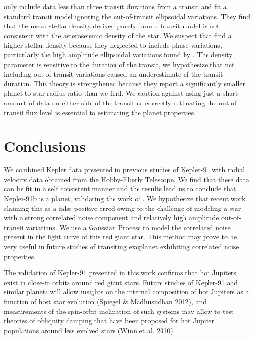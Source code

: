 \documentclass[apjl]{emulateapj}
\begin{document}
\citet{sliski14} only include data less than three transit durations from a transit and fit a standard transit model ignoring the out-of-transit ellipsoidal variations. They find that the mean stellar density derived purely from a transit model is not consistent with the asteroseismic density of the star. We suspect that \citeauthor{sliski14} find a higher stellar density because they neglected to include phase variations, particularly the high amplitude ellipsoidal variations found by \citet{lillo14}. The density parameter is sensitive to the duration of the transit, we hypothesize that not including out-of-transit variations caused an underestimate of the transit duration. This theory is strengthened because they report a significantly smaller planet-to-star radius ratio than we find. We caution against using just a short amount of data on either side of the transit as correctly estimating the out-of-transit flux level is essential to estimating the planet properties.





\section{Conclusions}
We combined Kepler data presented in previous studies of Kepler-91 with radial velocity data obtained from the Hobby-Eberly Telescope. We find that these data can be fit in a self consistent manner and the results lead us to conclude that Kepler-91b is a planet, validating the work of \citet{lillo14}. We hypothesize that recent work claiming this as a false positive erred owing to the challenge of modeling a star with a strong correlated noise component and relatively high amplitude out-of-transit variations. We use a Gaussian Process to model the correlated noise present in the light curve of this red giant star. This method may prove to be very useful in future studies of transiting exoplanet exhibiting correlated noise properties.

The validation of Kepler-91 presented in this work confirms that hot Jupiters exist in close-in orbits around red giant stars. Future studies of Kepler-91 and similar planets will allow insights on the internal composition of hot Jupiters as a function of host star evolution (Spiegel \& Madhusudhan 2012), and measurements of the spin-orbit inclination of such systems may allow to test theories of obliquity damping that have been proposed for hot Jupiter populations around less evolved stars (Winn et al. 2010).
\end{document}
